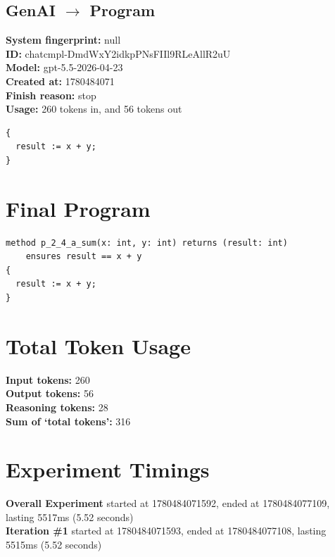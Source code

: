 \documentclass{article}
\begin{document}
\subsection*{GenAI $\rightarrow$ Program}
\textbf{System fingerprint: }null
\\\textbf{ID: }chatcmpl-DmdWxY2idkpPNsFIIl9RLeAllR2uU
\\\textbf{Model: }gpt-5.5-2026-04-23
\\\textbf{Created at: }1780484071
\\\textbf{Finish reason: }stop
\\\textbf{Usage: }260 tokens in, and 56 tokens out
\begin{lstlisting}
{
  result := x + y;
}
\end{lstlisting}
\section*{Final Program}
\begin{lstlisting}
method p_2_4_a_sum(x: int, y: int) returns (result: int)
	ensures result == x + y
{
  result := x + y;
}
\end{lstlisting}
\section*{Total Token Usage}
\textbf{Input tokens: }260
\\\textbf{Output tokens: }56
\\\textbf{Reasoning tokens: }28
\\\textbf{Sum of `total tokens': }316
\section*{Experiment Timings}
\textbf{Overall Experiment} started at 1780484071592, ended at 1780484077109, lasting 5517ms (5.52 seconds)
\\\textbf{Iteration \#1} started at 1780484071593, ended at 1780484077108, lasting 5515ms (5.52 seconds)
\end{document}
